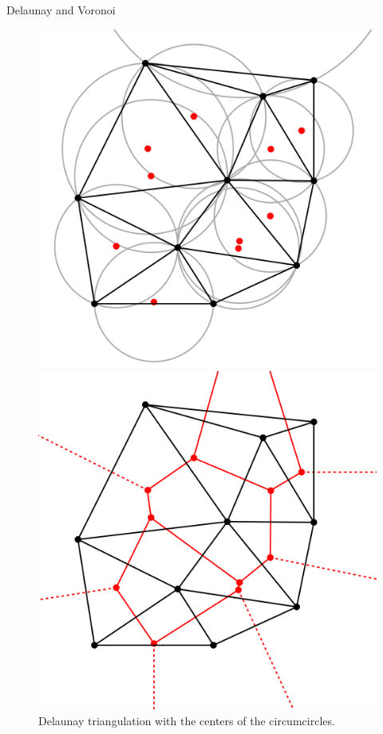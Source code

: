 \documentclass[10pt]{beamer}
\begin{document}
\begin{frame}{Delaunay and Voronoi}

  \begin{figure}[H]
    \centering
    \begin{minipage}{0.49\textwidth}
        \centering
        \includegraphics[width=\textwidth]{images/Delaunay_circumcircles_centers.svg.png}
        \caption{Delaunay triangulation with the centers of the circumcircles.}
    \end{minipage}\hfill
    \begin{minipage}{0.49\textwidth}
        \centering
        \includegraphics[width=\textwidth]{images/Delaunay_Voronoi.svg.png}

\end{minipage}
\end{figure}
\end{frame}
\end{document}
